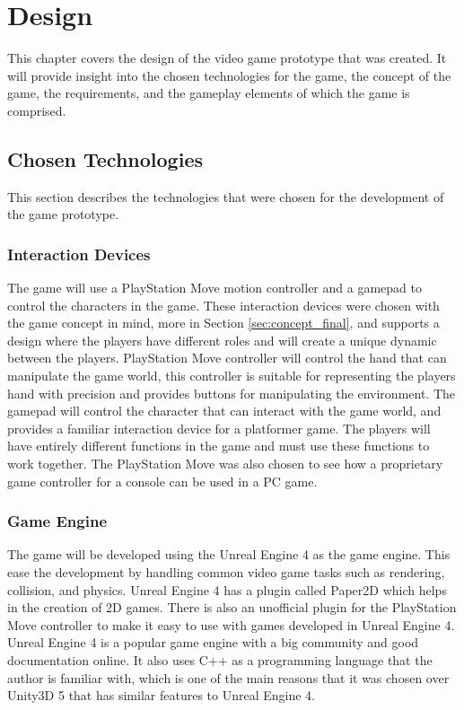 \chapter{Design}
\label{chp:design}
This chapter covers the design of the video game prototype that was created. It will provide insight into the chosen technologies for the game, the concept of the game, the requirements, and the gameplay elements of which the game is comprised.

\section{Chosen Technologies}
\label{sec:chosen_tech}
This section describes the technologies that were chosen for the development of the game prototype.

\subsection{Interaction Devices}
The game will use a PlayStation Move motion controller and a gamepad to control the characters in the game. These interaction devices were chosen with the game concept in mind, more in Section \ref{sec:concept_final}, and supports a design where the players have different roles and will create a unique dynamic between the players. PlayStation Move controller will control the hand that can manipulate the game world, this controller is suitable for representing the players hand with precision and provides buttons for manipulating the environment. The gamepad will control the character that can interact with the game world, and provides a familiar interaction device for a platformer game. The players will have entirely different functions in the game and must use these functions to work together. The PlayStation Move was also chosen to see how a proprietary game controller for a console can be used in a PC game.

\subsection{Game Engine}
The game will be developed using the Unreal Engine 4 as the game engine. This ease the development by handling common video game tasks such as rendering, collision, and physics. Unreal Engine 4 has a plugin called Paper2D which helps in the creation of 2D games. There is also an unofficial plugin for the PlayStation Move controller to make it easy to use with games developed in Unreal Engine 4. Unreal Engine 4 is a popular game engine with a big community and good documentation online. It also uses C++ as a programming language that the author is familiar with, which is one of the main reasons that it was chosen over Unity3D 5 that has similar features to Unreal Engine 4.

